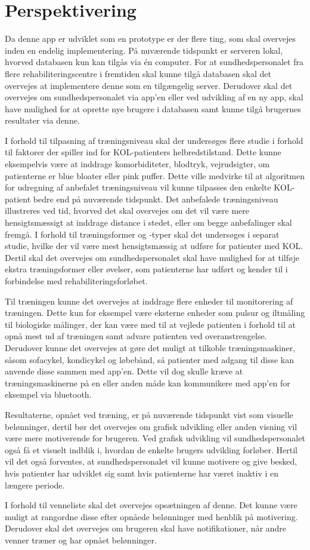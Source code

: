\section{Perspektivering}
Da denne app er udviklet som en prototype er der flere ting, som skal overvejes inden en endelig implementering. På nuværende tidspunkt er serveren lokal, hvorved databasen kun kan tilgås via én computer. For at sundhedspersonalet fra flere rehabiliteringscentre i fremtiden skal kunne tilgå databasen skal det overvejes at implementere denne som en tilgængelig server. Derudover skal det overvejes om sundhedspersonalet via app’en eller ved udvikling af en ny app, skal have mulighed for at oprette nye brugere i databasen samt kunne tilgå brugernes resultater via denne.  

I forhold til tilpasning af træningsniveau skal der undersøges flere studie i forhold til faktorer der spiller ind for KOL-patienters helbredstilstand. Dette kunne eksempelvis være at inddrage komorbiditeter, blodtryk, vejrudsigter, om patienterne er blue bloater eller pink puffer. Dette ville medvirke til at algoritmen for udregning af anbefalet træningsniveau vil kunne tilpasses den enkelte KOL-patient bedre end på nuværende tidspunkt. Det anbefalede træningsniveau illustreres ved tid, hvorved det skal overvejes om det vil være mere hensigtsmæssigt at inddrage distance i stedet, eller om begge anbefalinger skal fremgå. I forhold til træningsformer og -typer skal det undersøges i separat studie, hvilke der vil være mest hensigtsmæssig at udføre for patienter med KOL. Dertil skal det overvejes om sundhedspersonalet skal have mulighed for at tilføje ekstra træningsformer eller øvelser, som patienterne har udført og kender til i forbindelse med rehabiliteringsforløbet.

Til træningen kunne det overvejes at inddrage flere enheder til monitorering af træningen. Dette kun for eksempel være eksterne enheder som pulsur og iltmåling til biologiske målinger, der kan være med til at vejlede patienten i forhold til at opnå mest ud af træningen samt advare patienten ved overanstrengelse. Derudover kunne det overvejes at gøre det muligt at tilkoble træningsmaskiner, såsom sofacykel, kondicykel og løbebånd, så patienter med adgang til disse kan anvende disse sammen med app’en. Dette vil dog skulle kræve at træningsmaskinerne på en eller anden måde kan kommunikere med app’en for eksempel via bluetooth. 

Resultaterne, opnået ved træning, er på nuværende tidspunkt vist som visuelle belønninger, dertil bør det overvejes om grafisk udvikling eller anden visning vil være mere motiverende for  brugeren. Ved grafisk udvikling vil sundhedspersonalet også få et visuelt indblik i, hvordan de enkelte brugers udvikling forløber. Hertil vil det også forventes, at sundhedspersonalet vil kunne motivere og give besked, hvis patienter har udviklet sig samt hvis patienterne har været inaktiv i en længere periode. 

I forhold til venneliste skal det overvejes opsætningen af denne. Det kunne være muligt at rangordne disse efter opnåede belønninger med henblik på motivering. Derudover skal det overvejes om brugeren skal have notifikationer, når andre venner træner og har opnået belønninger. 